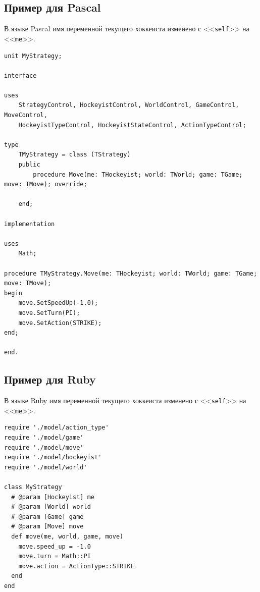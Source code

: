 \subsection{Пример для Pascal}

В языке Pascal имя переменной текущего хоккеиста изменено с <<\texttt{self}>> на <<\texttt{me}>>.

\begin{verbatim}
unit MyStrategy;

interface

uses
    StrategyControl, HockeyistControl, WorldControl, GameControl, MoveControl,
    HockeyistTypeControl, HockeyistStateControl, ActionTypeControl;

type
    TMyStrategy = class (TStrategy)
    public
        procedure Move(me: THockeyist; world: TWorld; game: TGame; move: TMove); override;

    end;

implementation

uses
    Math;
    
procedure TMyStrategy.Move(me: THockeyist; world: TWorld; game: TGame; move: TMove);
begin
    move.SetSpeedUp(-1.0);
    move.SetTurn(PI);
    move.SetAction(STRIKE);
end;

end.
\end{verbatim}

\subsection{Пример для Ruby}

В языке Ruby имя переменной текущего хоккеиста изменено с <<\texttt{self}>> на <<\texttt{me}>>.

\begin{verbatim}
require './model/action_type'
require './model/game'
require './model/move'
require './model/hockeyist'
require './model/world'

class MyStrategy
  # @param [Hockeyist] me
  # @param [World] world
  # @param [Game] game
  # @param [Move] move
  def move(me, world, game, move)
    move.speed_up = -1.0
    move.turn = Math::PI
    move.action = ActionType::STRIKE
  end
end
\end{verbatim}

